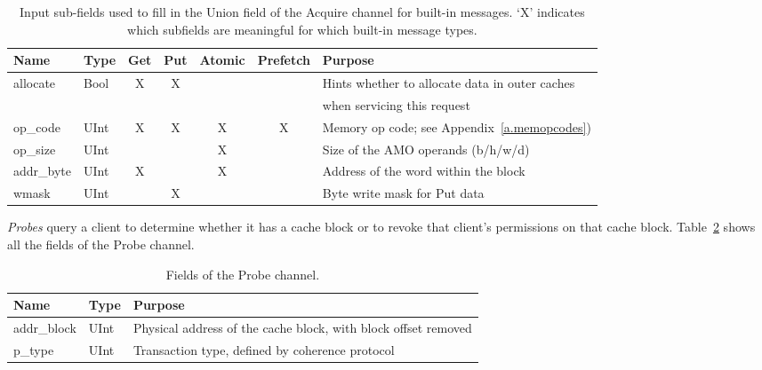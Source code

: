 \begin{table}
\begin{center}
\begin{tabular}{|l|l|c|c|c|c|l|}
    \hline
Name       & Type & Get & Put & Atomic & Prefetch & Purpose \\ \hline \hline
allocate   & Bool & X   & X   &        &          & Hints whether to allocate data in outer caches \\
           &      &     &     &        &          & when servicing this request \\ \hline
op\_code   & UInt & X   & X   & X      & X        & Memory op code; see Appendix~\ref{a.memopcodes}) \\ \hline
op\_size   & UInt &     &     & X      &          & Size of the AMO operands (b/h/w/d) \\ \hline
addr\_byte & UInt & X   &     & X      &          & Address of the word within the block \\ \hline
wmask      & UInt &     & X   &        &          & Byte write mask for Put data \\ \hline
\end{tabular}
\end{center}
\caption[The union field of the Acquire channel.]{
Input sub-fields used to fill in the Union field of the Acquire channel for built-in messages.
`X' indicates which  subfields are meaningful for which built-in message types.
}
\label{tab:union}
\end{table}



\emph{Probes} query a client to determine whether it has a cache block or to revoke that client's  permissions on that cache block.
Table~\ref{tab:probe} shows all the fields of the Probe channel.

\begin{table}[]
\begin{center}
\begin{tabular}{|l|l|l|}
    \hline
    Name & Type & Purpose \\ \hline \hline
addr\_block & UInt & Physical address of the cache block, with block offset removed \\ \hline
p\_type & UInt & Transaction type, defined by coherence protocol \\ \hline
\end{tabular}
\end{center}
\caption{Fields of the Probe channel.}
\label{tab:probe}
\end{table}


